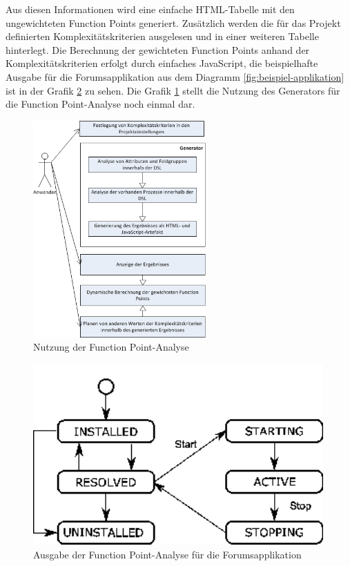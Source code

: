 \documentclass[a4paper,12pt]{scrreprt}
\begin{document}
Aus diesen Informationen wird eine einfache HTML-Tabelle mit den ungewichteten Function Points generiert. Zusätzlich werden die für das Projekt definierten Komplexitätskriterien ausgelesen und in einer weiteren Tabelle hinterlegt.
Die Berechnung der gewichteten Function Points anhand der Komplexitätskriterien erfolgt durch einfaches JavaScript, die beispielhafte Ausgabe für die Forumsapplikation aus dem Diagramm \ref{fig:beispiel-applikation} ist in der Grafik \ref{fig:fpa-ergebnis} zu sehen. Die Grafik \ref{fig:fpa-ablauf} stellt die Nutzung des Generators für die Function Point-Analyse noch einmal dar.
\begin{figure}[h!]
	\centering
		\includegraphics[width=250px]{diagramme/fpa-ablauf.png}
		\caption{Nutzung der Function Point-Analyse}
		\label{fig:fpa-ablauf}
\end{figure}
\begin{figure}[h!]
	\centering
		\includegraphics[width=420px]{img/fpa.png}
		\caption{Ausgabe der Function Point-Analyse für die Forumsapplikation}
		\label{fig:fpa-ergebnis}
\end{figure}
\label{sec:annotationen}
\end{document}
